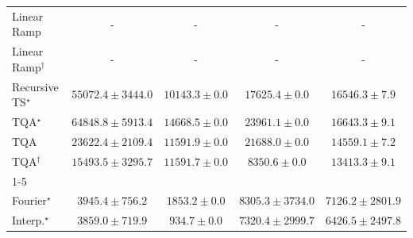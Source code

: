 \begin{tabular}{l|cccc|}
Linear Ramp & {\cellcolor[HTML]{000000}} \color[HTML]{F1F1F1} {\cellcolor{white}} \color{black} - & {\cellcolor[HTML]{000000}} \color[HTML]{F1F1F1} {\cellcolor{white}} \color{black} - & {\cellcolor[HTML]{000000}} \color[HTML]{F1F1F1} {\cellcolor{white}} \color{black} - & {\cellcolor[HTML]{000000}} \color[HTML]{F1F1F1} {\cellcolor{white}} \color{black} - \\
Linear Ramp$^\dagger$ & {\cellcolor[HTML]{000000}} \color[HTML]{F1F1F1} {\cellcolor{white}} \color{black} - & {\cellcolor[HTML]{000000}} \color[HTML]{F1F1F1} {\cellcolor{white}} \color{black} - & {\cellcolor[HTML]{000000}} \color[HTML]{F1F1F1} {\cellcolor{white}} \color{black} - & {\cellcolor[HTML]{000000}} \color[HTML]{F1F1F1} {\cellcolor{white}} \color{black} - \\
Recursive TS$^\star$ & {\cellcolor[HTML]{12763D}} \color[HTML]{F1F1F1} $55072.4\pm 3444.0$ & {\cellcolor[HTML]{FDFED9}} \color[HTML]{000000} $10143.3\pm 0.0$ & {\cellcolor[HTML]{EDF8B2}} \color[HTML]{000000} $17625.4\pm 0.0$ & {\cellcolor[HTML]{F2FAB5}} \color[HTML]{000000} $16546.3\pm 7.9$ \\
TQA$^\star$ & {\cellcolor[HTML]{004A2B}} \color[HTML]{F1F1F1} $64848.8\pm 5913.4$ & {\cellcolor[HTML]{F8FCBD}} \color[HTML]{000000} $14668.5\pm 0.0$ & {\cellcolor[HTML]{D0EC9F}} \color[HTML]{000000} $23961.1\pm 0.0$ & {\cellcolor[HTML]{F2FAB5}} \color[HTML]{000000} $16643.3\pm 9.1$ \\
TQA & {\cellcolor[HTML]{D3EDA0}} \color[HTML]{000000} $23622.4\pm 2109.4$ & {\cellcolor[HTML]{FBFED0}} \color[HTML]{000000} $11591.9\pm 0.0$ & {\cellcolor[HTML]{DDF1A6}} \color[HTML]{000000} $21688.0\pm 0.0$ & {\cellcolor[HTML]{F8FCBE}} \color[HTML]{000000} $14559.1\pm 7.2$ \\
TQA$^\dagger$ & {\cellcolor[HTML]{F7FCB9}} \color[HTML]{000000} $15493.5\pm 3295.7$ & {\cellcolor[HTML]{FBFED0}} \color[HTML]{000000} $11591.7\pm 0.0$ & {\cellcolor[HTML]{FFFFE4}} \color[HTML]{000000} $8350.6\pm 0.0$ & {\cellcolor[HTML]{F9FDC5}} \color[HTML]{000000} $13413.3\pm 9.1$ \\
\cline{1-5}
\multicolumn{5}{c}{\rule{0pt}{8pt}SV} \\
\midrule
Fourier$^\star$ & {\cellcolor[HTML]{9CB9D9}} \color[HTML]{000000} $3945.4\pm 756.2$ & {\cellcolor[HTML]{EDE7F2}} \color[HTML]{000000} $1853.2\pm 0.0$ & {\cellcolor[HTML]{023C5F}} \color[HTML]{F1F1F1} $8305.3\pm 3734.0$ & {\cellcolor[HTML]{04629A}} \color[HTML]{F1F1F1} $7126.2\pm 2801.9$ \\
Interp.$^\star$ & {\cellcolor[HTML]{A1BBDA}} \color[HTML]{000000} $3859.0\pm 719.9$ & {\cellcolor[HTML]{FFF7FB}} \color[HTML]{000000} $934.7\pm 0.0$ & {\cellcolor[HTML]{045E93}} \color[HTML]{F1F1F1} $7320.4\pm 2999.7$ & {\cellcolor[HTML]{0C74B2}} \color[HTML]{F1F1F1} $6426.5\pm 2497.8$ \\

\end{tabular}
